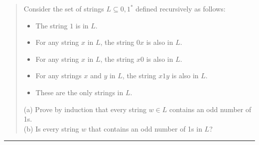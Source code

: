 \documentclass[11pt]{article}
\begin{document}

\begin{quote}
    Consider the set of strings $L \subseteq {0,1}^*$ defined recursively as follows:
    \begin{itemize}
        \item The string $1$ is in $L$.
        \item For any string $x$ in $L$, the string $0x$ is also in $L$.
        \item For any string $x$ in $L$, the string $x0$ is also in $L$.
        \item For any strings $x$ and $y$ in $L$, the string $x1y$ is also in $L$.
        \item These are the only strings in $L$.
    \end{itemize}
    (a) Prove by induction that every string $w \in L$ contains an odd number of 1s. \\
    (b) Is every string $w$ that contains an odd number of 1s in $L$?  \\
\end{quote}
\hrule
\end{document}
